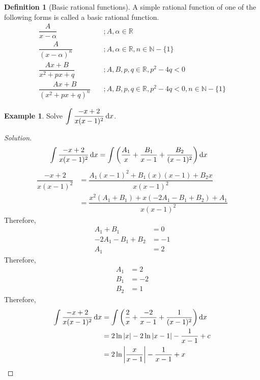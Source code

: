 \documentclass[fleqn, a4paper, 10pt]{article}
\theoremstyle{definition}
\newtheorem{example}{Example}
\newtheorem{definition}{Definition}
\theoremstyle{theorem}
\theoremstyle{remark}
\newenvironment{solution}
	{\begin{proof}[Solution]\let\qed\relax}
	{\end{proof}}
\begin{document}
\begin{multicols}{2}
\begin{definition}[Basic rational functions]
	A simple rational function of one of the following forms is called a basic rational function.
	\begin{align*}
		\dfrac{A}{x - \alpha} &\quad; A, \alpha \in \mathbb{R}\\
		\dfrac{A}{(x - \alpha)^n} &\quad; A, \alpha \in \mathbb{R}, n \in \mathbb{N} - \{1\}\\
		\dfrac{Ax +  B}{x^2 + px + q} &\quad; A, B, p, q \in \mathbb{R}, p^2 - 4q < 0\\
		\dfrac{Ax + B}{(x^2 + px + q)^n} &\quad; A, B, p, q \in \mathbb{R}, p^2 - 4q < 0, n \in \mathbb{N} - \{1\}
	\end{align*}
\end{definition}

\begin{example}
	Solve $\displaystyle \int \dfrac{-x + 2}{x(x - 1)^2} \dif x$.
\end{example}

\begin{solution}
	\begin{align*}
		\int \dfrac{-x + 2}{x(x - 1)^2} \dif x &= \int \left(\dfrac{A_1}{x} + \dfrac{B_1}{x - 1} + \dfrac{B_2}{(x - 1)^2}\right) \dif x
	\end{align*}
	\begin{align*}
		\dfrac{-x + 2}{x(x - 1)^2} &= \dfrac{A_1 (x - 1)^2 + B_1 (x)(x - 1) + B_2 x}{x(x - 1)^2}\\
		&= \dfrac{x^2(A_1 + B_1) + x(-2A_1 - B_1 + B_2) + A_1}{x(x - 1)^2}
	\end{align*}
	Therefore,
	\begin{align*}
		A_1 + B_1 &= 0\\
		-2A_1 - B_1 + B_2 &= -1\\
		A_1 &= 2
	\end{align*}
	Therefore, 
	\begin{align*}
		A_1 &= 2\\
		B_1 &= -2\\
		B_2 &= 1
	\end{align*}
	Therefore,
	\begin{align*}
		\int \dfrac{-x + 2}{x(x - 1)^2} \dif x &= \int \left(\dfrac{2}{x} + \dfrac{-2}{x - 1} + \dfrac{1}{(x - 1)^2}\right) \dif x\\
		&= 2 \ln |x| - 2 \ln |x - 1| - \dfrac{1}{x - 1} + c\\
		&= 2 \ln \left|\dfrac{x}{x - 1}\right| - \dfrac{1}{x - 1} + x
	\end{align*}
\end{solution}


\end{multicols}
\end{document}
